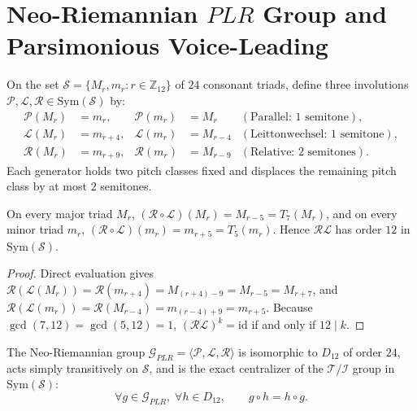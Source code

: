 \section{Neo-Riemannian $PLR$ Group and Parsimonious Voice-Leading}

\begin{definition}
On the set $\mathcal{S} = \{M_r, m_r : r \in \mathbb{Z}_{12}\}$ of $24$ consonant triads, define three involutions $\mathcal{P}, \mathcal{L}, \mathcal{R} \in \mathrm{Sym}(\mathcal{S})$ by:
\begin{align}
\mathcal{P}(M_r) &= m_r, & \mathcal{P}(m_r) &= M_r & (\text{Parallel: } 1\text{ semitone}), \\
\mathcal{L}(M_r) &= m_{r+4}, & \mathcal{L}(m_r) &= M_{r-4} & (\text{Leittonwechsel: } 1\text{ semitone}), \\
\mathcal{R}(M_r) &= m_{r+9}, & \mathcal{R}(m_r) &= M_{r-9} & (\text{Relative: } 2\text{ semitones}).
\end{align}
Each generator holds two pitch classes fixed and displaces the remaining pitch class by at most $2$ semitones.
\end{definition}

\begin{lemma}
On every major triad $M_r$, $(\mathcal{R}\circ\mathcal{L})(M_r) = M_{r-5} = T_7(M_r)$, and on every minor triad $m_r$, $(\mathcal{R}\circ\mathcal{L})(m_r) = m_{r+5} = T_5(m_r)$. Hence $\mathcal{R}\mathcal{L}$ has order $12$ in $\mathrm{Sym}(\mathcal{S})$.
\end{lemma}

\begin{proof}
Direct evaluation gives $\mathcal{R}(\mathcal{L}(M_r)) = \mathcal{R}(m_{r+4}) = M_{(r+4)-9} = M_{r-5} = M_{r+7}$, and $\mathcal{R}(\mathcal{L}(m_r)) = \mathcal{R}(M_{r-4}) = m_{(r-4)+9} = m_{r+5}$. Because $\gcd(7, 12) = \gcd(5, 12) = 1$, $(\mathcal{R}\mathcal{L})^k = \mathrm{id}$ if and only if $12 \mid k$.
\end{proof}

\begin{theorem}
\label{thm:plr-dual}
The Neo-Riemannian group $\mathcal{G}_{PLR} = \langle \mathcal{P}, \mathcal{L}, \mathcal{R} \rangle$ is isomorphic to $D_{12}$ of order $24$, acts simply transitively on $\mathcal{S}$, and is the exact centralizer of the $\mathcal{T}/\mathcal{I}$ group in $\mathrm{Sym}(\mathcal{S})$:
\begin{equation}
\forall g \in \mathcal{G}_{PLR},\;\forall h \in D_{12},\qquad g \circ h = h \circ g.
\end{equation}
\end{theorem}

